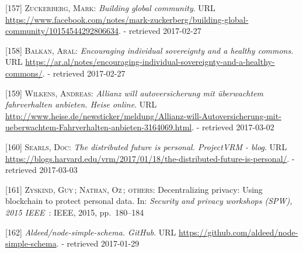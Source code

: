 \documentclass[12pt,english,a4paper,titlepage,cleardoublepage=empty,dottedtoc]{report}
\begin{document}
\hypertarget{ref-web_2017_facebook_building-global-community}{}
{[}157{]} \textsc{Zuckerberg, Mark}: \emph{Building global community}.
URL
\url{https://www.facebook.com/notes/mark-zuckerberg/building-global-community/10154544292806634}.
- retrieved 2017-02-27

\hypertarget{ref-web_2017_encouraging-individual-sovereignty}{}
{[}158{]} \textsc{Balkan, Aral}: \emph{Encouraging individual
sovereignty and a healthy commons}. URL
\url{https://ar.al/notes/encouraging-individual-sovereignty-and-a-healthy-commons/}.
- retrieved 2017-02-27

\hypertarget{ref-web_2016_insurance-discount-in-return-of-data}{}
{[}159{]} \textsc{Wilkens, Andreas}: \emph{Allianz will autoversicherung
mit überwachtem fahrverhalten anbieten. Heise online}. URL
\url{http://www.heise.de/newsticker/meldung/Allianz-will-Autoversicherung-mit-ueberwachtem-Fahrverhalten-anbieten-3164069.html}.
- retrieved 2017-03-02

\hypertarget{ref-web_2017_distributed-future-is-personal}{}
{[}160{]} \textsc{Searls, Doc}: \emph{The distributed future is
personal. ProjectVRM - blog}. URL
\url{https://blogs.harvard.edu/vrm/2017/01/18/the-distributed-future-is-personal/}.
- retrieved 2017-03-03

\hypertarget{ref-paper_2015_decentralizing-privacy-using-blockchain-to-protect-personal-data}{}
{[}161{]} \textsc{Zyskind, Guy}\,; \textsc{Nathan, Oz}\,;
\textsc{others}: Decentralizing privacy: Using blockchain to protect
personal data. In: \emph{Security and privacy workshops (SPW), 2015
IEEE}~: IEEE, 2015, pp.~180--184

\hypertarget{ref-web_2017_repo_node-simple-schema}{}
{[}162{]} \emph{Aldeed/node-simple-schema. GitHub}. URL
\url{https://github.com/aldeed/node-simple-schema}. - retrieved
2017-01-29
\end{document}
